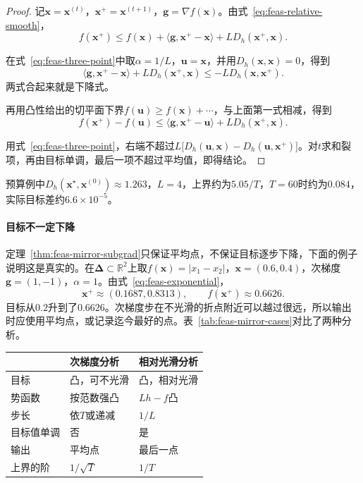\begin{proof}
记$\bm{x}=\bm{x}^{(t)}$，$\bm{x}^{+}=\bm{x}^{(t+1)}$，$\bm{g}=\nabla f(\bm{x})$。由式~\eqref{eq:feas-relative-smooth}，
\[
 f(\bm{x}^{+})\leq f(\bm{x})+\langle\bm{g},\bm{x}^{+}-\bm{x}\rangle+LD_h(\bm{x}^{+},\bm{x}).
\]

在式~\eqref{eq:feas-three-point}中取$\alpha=1/L$，$\bm{u}=\bm{x}$，并用$D_h(\bm{x},\bm{x})=0$，得到
\[
 \langle\bm{g},\bm{x}^{+}-\bm{x}\rangle+LD_h(\bm{x}^{+},\bm{x})\leq-LD_h(\bm{x},\bm{x}^{+}).
\]
两式合起来就是下降式。

再用凸性给出的切平面下界$f(\bm{u})\geq f(\bm{x})+\cdots$，与上面第一式相减，得到
\[
 f(\bm{x}^{+})-f(\bm{u})\leq\langle\bm{g},\bm{x}^{+}-\bm{u}\rangle+LD_h(\bm{x}^{+},\bm{x}).
\]

用式~\eqref{eq:feas-three-point}，右端不超过$L\bigl[D_h(\bm{u},\bm{x})-D_h(\bm{u},\bm{x}^{+})\bigr]$。对$t$求和裂项，再由目标单调，最后一项不超过平均值，即得结论。
\end{proof}

预算例中$D_h(\bm{x}^\star,\bm{x}^{(0)})\approx1.263$，$L=4$，上界约为$5.05/T$，$T=60$时约为$0.084$，实际目标差约$6.6\times10^{-5}$。

\paragraph{目标不一定下降}
定理~\ref{thm:feas-mirror-subgrad}只保证平均点，不保证目标逐步下降，下面的例子说明这是真实的。在$\bm{\Delta}\subset\mathbb{R}^2$上取$f(\bm{x})=\lvert x_1-x_2\rvert$，$\bm{x}=(0.6,0.4)$，次梯度$\bm{g}=(1,-1)$，$\alpha=1$。由式~\eqref{eq:feas-exponential}，
\[
 \bm{x}^{+}\approx(0.1687,0.8313),\qquad f(\bm{x}^{+})\approx0.6626.
\]
目标从$0.2$升到了$0.6626$。次梯度步在不光滑的折点附近可以越过很远，所以输出时应使用平均点，或记录迄今最好的点。表~\ref{tab:feas-mirror-cases}对比了两种分析。

\begin{BookInlineTable}
  \centering
  \caption{镜像下降的两种分析。}
  \label{tab:feas-mirror-cases}
  \begin{tabular}{lll}
   \toprule
   & 次梯度分析 & 相对光滑分析\\
   \midrule
   目标 & 凸，可不光滑 & 凸，相对光滑\\
   势函数 & 按范数强凸 & $Lh-f$凸\\
   步长 & 依$T$或递减 & $1/L$\\
   目标值单调 & 否 & 是\\
   输出 & 平均点 & 最后一点\\
   上界的阶 & $1/\sqrt{T}$ & $1/T$\\
   \bottomrule
  \end{tabular}
\end{BookInlineTable}
